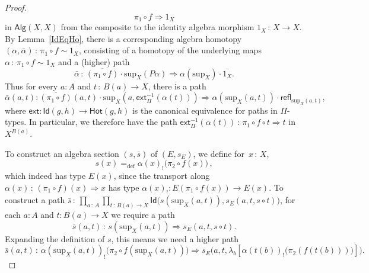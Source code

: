 \documentclass[10pt,a4paper,oneside,reqno]{amsart}
\theoremstyle{mythm}
\theoremstyle{mydef}
\theoremstyle{myrmk}
\newcommand{\defeq}{=_{\mathrm{def}}}
\newcommand{\co}{\,{:}\,}
\newcommand{\com}{\circ}
\newcommand{\ct}{\cdot}
\newcommand{\Hot}{\mathsf{Hot}}
\newcommand{\ext}{\mathsf{ext}}
\newcommand{\Id}{\mathsf{Id}}
\newcommand{\refl}{\mathsf{refl}}
\newcommand{\lam}[1]{\lambda_{#1}}
\newcommand{\Palg}{\mathsf{Alg}}
\renewcommand{\sup}{\mathrm{sup}}
\begin{document}
\begin{proof}
\begin{equation*}
\pi_1 \circ f \Rightarrow 1_X 
\end{equation*}
in $\Palg(X,X)$ from the composite to the identity algebra morphism $1_X \co X \to X$.
%
By Lemma~\ref{IdEqHo}, there is a corresponding algebra homotopy $(\alpha,\bar{\alpha}) \co \pi_1 \circ f \sim 1_X$,  consisting of a homotopy of the underlying maps $\alpha \co \pi_1 \circ f \sim 1_X$ and a (higher) path
\begin{equation*}
\bar{\alpha} \co \overline{(\pi_1 \com f)} \cdot \sup_X (P \alpha) \Rightarrow \alpha(\sup_X) \cdot \overline{1_X}.
\end{equation*}
Thus for every $a:A$ and $t\co B(a)\to X$, there is a path
\begin{equation}\label{equ:alphabar}
\bar{\alpha}(a,t) :   \overline{(\pi_1 \com f)}(a,t) \ct \sup_X(a,\ext_\Pi^{-1}(\alpha(t))) \Rightarrow \alpha(\sup_X(a,t)) \cdot \refl_{\sup_X(a,t)},
\end{equation}
where $\ext : \Id(g,h) \to \Hot(g, h)$ is the canonical equivalence for paths in $\Pi$-types. 
In particular, we therefore have the path $\ext_\Pi^{-1}(\alpha(t))\co\pi_1 \circ f \circ t \Rightarrow t$ in $X^{B(a)}$.

To construct an algebra section $(s, \bar{s})$ of $(E, s_E)$, we define for~$x \co X$, 
\begin{equation}
\label{equ:defreqsection}
s(x) \defeq \alpha(x)_{!} \big( \pi_2 \com f (x) \big) \, ,
\end{equation}
which indeed has type $E(x)$, since the transport along $\alpha(x) \co (\pi_1 \circ f)(x) \Rightarrow x$ has type $\alpha(x)_{!} : E(\pi_1 \com f (x)) \to E(x)$.
%
To construct a path $\bar{s} \co \prod_{a \co A} \prod_{t \co B(a) \to X} \Id \big( s(\sup_X(a,t)), s_E(a, t, s \circ t) \big)$, for each $a:A$ and $t:B(a)\to X$ we require a path
\[
\bar{s}(a,t) \co s(\sup_X(a,t)) \Rightarrow s_E(a, t, s \circ t).
\] 
Expanding the definition of $s$, this means we need a higher path
\begin{equation}\label{eq:proof:thm:WMain:needpath}
\bar{s}(a,t) \co \alpha(\sup_X(a,t))_{!} \big( \pi_2 \com f (\sup_X(a,t)) \big) \Rightarrow s_E\big(a, t, \lam{b}[\alpha(t(b))_{!} \big( \pi_2 (f(t(b)))\big)]\big).
\end{equation}


\end{proof}
\end{document}
